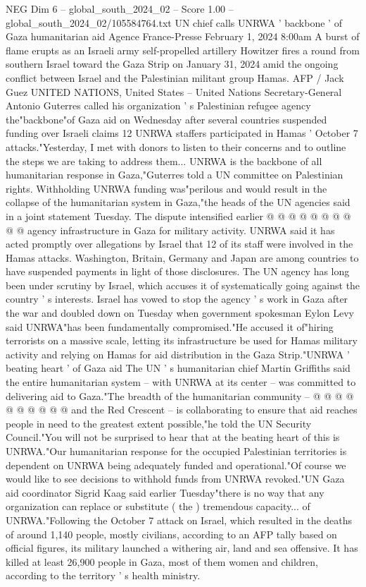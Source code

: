 \begin{textsample}{NEG Dim 6 – global\_south\_2024\_02 – Score 1.00 – global\_south\_2024\_02/105584764.txt}  \label{ex:f6_neg_268}
UN chief calls UNRWA ' backbone ' of Gaza humanitarian aid Agence France-Presse February 1, 2024 8:00am A burst of flame erupts as an Israeli army self-propelled artillery Howitzer fires a round from southern Israel toward the Gaza Strip on January 31, 2024 amid the ongoing conflict between Israel and the Palestinian militant group Hamas.
AFP / Jack Guez UNITED NATIONS, United States -- United Nations Secretary-General Antonio Guterres called his organization ' s Palestinian refugee agency the"backbone"of Gaza aid on Wednesday after several countries suspended funding over Israeli claims 12 UNRWA staffers participated in Hamas ' October 7 attacks."Yesterday, I met with donors to listen to their concerns and to outline the steps we are taking to address them...
UNRWA is the backbone of all humanitarian response in Gaza,"Guterres told a UN committee on Palestinian rights.
Withholding UNRWA funding was"perilous and would result in the collapse of the humanitarian system in Gaza,"the heads of the UN agencies said in a joint statement Tuesday.
The dispute intensified earlier @ @ @ @ @ @ @ @ @ @ agency infrastructure in Gaza for military activity.
UNRWA said it has acted promptly over allegations by Israel that 12 of its staff were involved in the Hamas attacks.
Washington, Britain, Germany and Japan are among countries to have suspended payments in light of those disclosures.
The UN agency has long been under scrutiny by Israel, which accuses it of systematically going against the country ' s interests.
Israel has vowed to stop the agency ' s work in Gaza after the war and doubled down on Tuesday when government spokesman Eylon Levy said UNRWA"has been fundamentally compromised."He accused it of"hiring terrorists on a massive scale, letting its infrastructure be used for Hamas military activity and relying on Hamas for aid distribution in the Gaza Strip."UNRWA ' beating heart ' of Gaza aid The UN ' s humanitarian chief Martin Griffiths said the entire humanitarian system -- with UNRWA at its center -- was committed to delivering aid to Gaza."The breadth of the humanitarian community -- @ @ @ @ @ @ @ @ @ @ and the Red Crescent -- is collaborating to ensure that aid reaches people in need to the greatest extent possible,"he told the UN Security Council."You will not be surprised to hear that at the beating heart of this is UNRWA."Our humanitarian response for the occupied Palestinian territories is dependent on UNRWA being adequately funded and operational."Of course we would like to see decisions to withhold funds from UNRWA revoked."UN Gaza aid coordinator Sigrid Kaag said earlier Tuesday"there is no way that any organization can replace or substitute ( the ) tremendous capacity... of UNRWA."Following the October 7 attack on Israel, which resulted in the deaths of around 1,140 people, mostly civilians, according to an AFP tally based on official figures, its military launched a withering air, land and sea offensive.
It has killed at least 26,900 people in Gaza, most of them women and children, according to the territory ' s health ministry.

\end{textsample}
